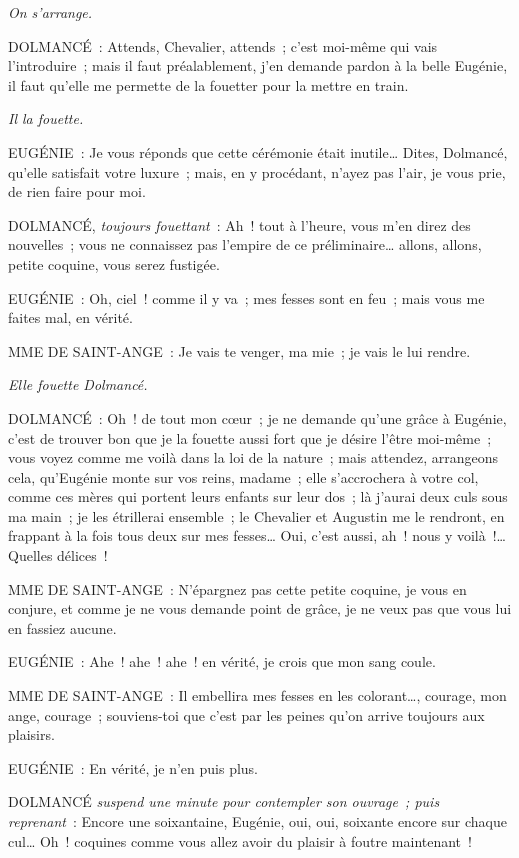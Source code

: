 \documentclass[french,twoside]{book} %
\begin{document}
{\itshape On s’arrange.}\par
DOLMANCÉ : Attends, Chevalier, attends ; c’est moi-même qui vais l’introduire ; mais il faut préalablement, j’en demande pardon à la belle Eugénie, il faut qu’elle me permette de la fouetter pour la mettre en train.\par
{\itshape Il la fouette.}\par
EUGÉNIE : Je vous réponds que cette cérémonie était inutile… Dites, Dolmancé, qu’elle satisfait votre luxure ; mais, en y procédant, n’ayez pas l’air, je vous prie, de rien faire pour moi.\par
DOLMANCÉ, {\itshape toujours fouettant} : Ah ! tout à l’heure, vous m’en direz des nouvelles ; vous ne connaissez pas l’empire de ce préliminaire… allons, allons, petite coquine, vous serez fustigée.\par
EUGÉNIE : Oh, ciel ! comme il y va ; mes fesses sont en feu ; mais vous me faites mal, en vérité.\par
MME DE SAINT-ANGE : Je vais te venger, ma mie ; je vais le lui rendre.\par
{\itshape Elle fouette Dolmancé.}\par
DOLMANCÉ : Oh ! de tout mon cœur ; je ne demande qu’une grâce à Eugénie, c’est de trouver bon que je la fouette aussi fort que je désire l’être moi-même ; vous voyez comme me voilà dans la loi de la nature ; mais attendez, arrangeons cela, qu’Eugénie monte sur vos reins, madame ; elle s’accrochera à votre col, comme ces mères qui portent leurs enfants sur leur dos ; là j’aurai deux culs sous ma main ; je les étrillerai ensemble ; le Chevalier et Augustin me le rendront, en frappant à la fois tous deux sur mes fesses… Oui, c’est aussi, ah ! nous y voilà !… Quelles délices !\par
MME DE SAINT-ANGE : N’épargnez pas cette petite coquine, je vous en conjure, et comme je ne vous demande point de grâce, je ne veux pas que vous lui en fassiez aucune.\par
EUGÉNIE : Ahe ! ahe ! ahe ! en vérité, je crois que mon sang coule.\par
MME DE SAINT-ANGE : Il embellira mes fesses en les colorant…, courage, mon ange, courage ; souviens-toi que c’est par les peines qu’on arrive toujours aux plaisirs.\par
EUGÉNIE : En vérité, je n’en puis plus.\par
DOLMANCÉ {\itshape suspend une minute pour contempler son ouvrage ; puis reprenant} : Encore une soixantaine, Eugénie, oui, oui, soixante encore sur chaque cul… Oh ! coquines comme vous allez avoir du plaisir à foutre maintenant !\par
\end{document}
